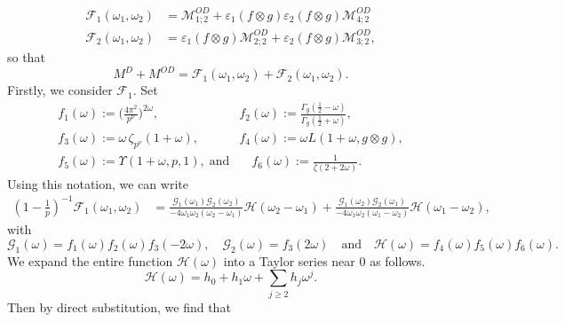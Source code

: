 \documentclass[12pt]{amsart}
\theoremstyle{plain}
\theoremstyle{definition}
\begin{document}
    \begin{align*}
    \mathscr{F}_1(\omega_1, \omega_2)
    &= \mathscr{M}^{OD}_{1;2}
     +   \varepsilon_1(f\otimes g )   \varepsilon_2(f\otimes g ) 
    \mathscr{M}^{OD}_{4;2}
    \\
    \mathscr{F}_2(\omega_1, \omega_2) 
    &=  \varepsilon_1(f\otimes g ) \mathscr{M}^{OD}_{2;2}
    +   \varepsilon_2(f\otimes g ) \mathscr{M}^{OD}_{3;2} ,
    \end{align*}
so that     
    \[
    M^D+M^{OD}
    =\mathscr{F}_1(\omega_1, \omega_2)+\mathscr{F}_2(\omega_1, \omega_2) .
    \]
Firstly, we consider $\mathscr{F}_1$. Set 
    \begin{align*}
    f_1(\omega):=\Big(\frac{4\pi^2}{p^{\nu}}\Big)^{2\omega},
    \qquad & f_2(\omega):=\frac{\Gamma_g\left(\frac12-\omega\right)}{\Gamma_g\left(\frac12+\omega\right)},
    \\
    f_{3}(\omega):=\omega \, \zeta_{p^\nu}\left(1+\omega\right),
    \qquad  &
     f_4(\omega):=\omega L(1+\omega, g\otimes g) ,
    \\
    f_5(\omega):=\Upsilon(1+\omega, p,1), 
    \; \text{and}& \quad f_6(\omega):=\frac{1}{\zeta(2+2\omega)}.
    \end{align*}
Using this notation, we can write
    \begin{align*}
    \left(1-\frac{1}{p}\right)^{-1}
    \mathscr{F}_1(\omega_1,\omega_2)
    &=\frac{\mathcal{G}_1(\omega_1)\mathcal{G}_2(\omega_2)}{-4\omega_1\omega_2(\omega_2-\omega_1)}\mathcal{H}(\omega_2-\omega_1)+\frac{\mathcal{G}_1(\omega_2)\mathcal{G}_2(\omega_1)}{-4\omega_1\omega_2(\omega_1-\omega_2)}\mathcal{H}(\omega_1-\omega_2),
    \end{align*}
with 
    \[
    \mathcal{G}_1(\omega)=f_1(\omega)f_2(\omega)f_3(-2\omega), 
    \quad \mathcal{G}_2(\omega)=f_3(2\omega) \quad
    \text{and}\quad \mathcal{H}(\omega)=f_4(\omega)f_5(\omega)f_6(\omega).
    \]
We expand the entire function $\mathcal{H}(\omega)$ into a Taylor series near 0 as follows.
    \[
    \mathcal{H}(\omega)=h_0+h_{1}\omega+\sum_{j\geq2}h_j\omega^{j}.
    \]
Then by direct substitution, we find that
\end{document}
